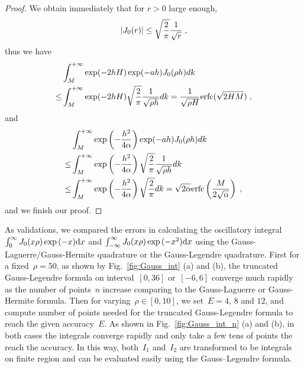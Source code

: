 \begin{proof}
We obtain immediately that for $r>0$ large enough,     
\begin{equation*}
   \left\lvert J_0(r)\right\rvert\leq \sqrt{\frac{2}{\pi}} \frac{1}{\sqrt{r}}\;, 
\end{equation*}
thus we have 
\begin{align*}
   & \int_M^{+\infty}  \exp(-2hH)\exp(-ah)  J_0(\rho h)d k \\
\leq & \int_M^{+\infty}  \exp(-2hH)\sqrt{\frac{2}{\pi}} \frac{1}{\sqrt{\rho h}} d k=\frac{1}{\sqrt{\rho H}}\mathrm{erfc}(\sqrt{2HM})\;,
\end{align*}
and 
\begin{align*}
  &\int_M^{+\infty}  \exp\left(-\frac{h^2}{4\alpha}\right)  \exp(-ah)  J_0(\rho h)d k \\
  \leq &\int_M^{+\infty} \exp\left(-\frac{h^2}{4\alpha}\right)\sqrt{\frac{2}{\pi}} \frac{1}{\sqrt{\rho h}} d k\\ 
  \leq &\int_M^{+\infty} \exp\left(-\frac{h^2}{4\alpha}\right)\sqrt{\frac{2}{\pi}} d k=\sqrt{2\alpha} \mathrm{erfc}\left(\frac{M}{2\sqrt{\alpha}}\right)\;,
\end{align*}
and we finish our proof.
\end{proof}

As validations, we compared the errors in calculating the oscillatory integral $\int_0^{\infty} J_0(x \rho) \exp{(-x)} \mathrm{d}x$ and $\int_{-\infty}^{\infty} J_0(x \rho) \exp{(-x^2)} \mathrm{d}x$ using the Gauss-Laguerre/Gauss-Hermite quadrature or the Gauss-Legendre quadrature.
First for a fixed~$\rho = 50$, as shown by Fig.~\ref{fig:Gauss_int} (a) and (b), the truncated Gauss-Legendre formula on interval~$[0, 36]$ or~$[-6, 6]$ converge much rapidly as the number of points~$n$ increase comparing to the Gauss-Laguerre or Gauss-Hermite formula.
Then for varying~$\rho \in [0, 10]$, we set~$E = 4$, $8$ and $12$, and compute number of points needed for the truncated Gauss-Legendre formula to reach the given accuracy~$E$.
As shown in Fig.~\ref{fig:Gauss_int_n} (a) and (b), in both cases the integrals converge rapidly and only take a few tens of points the reach the accuracy.
In this way, both~$I_1$ and~$I_2$ are transformed to be integrals on finite region and can be evaluated easily using the Gauss–Legendre formula.


